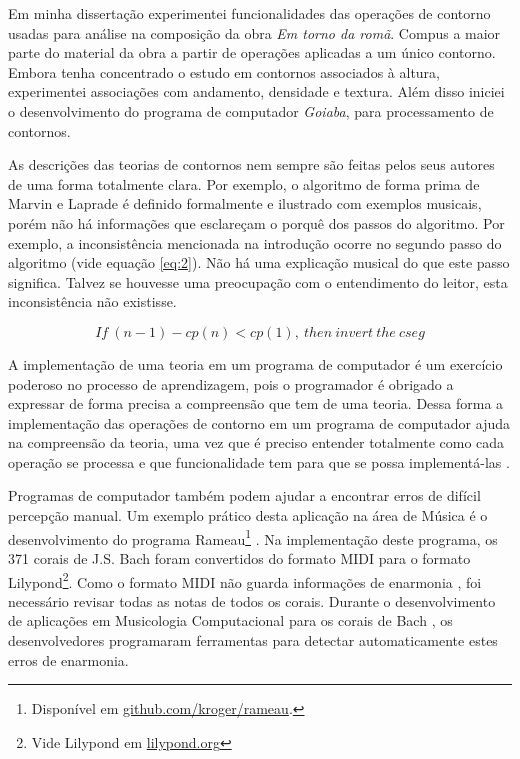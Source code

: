 \documentclass[12pt]{article}
\newcommand{\goiaba}[0]{\textit{Goiaba}}
\newcommand{\obra}[0]{\textit{Em torno da romã}}
\begin{document}

Em minha dissertação \cite{sampaio08:em} experimentei funcionalidades
das operações de contorno usadas para análise na composição da obra
\obra{}. Compus a maior parte do material da obra a partir de
operações aplicadas a um único contorno. Embora tenha concentrado o
estudo em contornos associados à altura, experimentei associações com
andamento, densidade e textura. Além disso iniciei o desenvolvimento
do programa de computador \goiaba{}, para processamento de contornos.

As descrições das teorias de contornos nem sempre são feitas pelos
seus autores de uma forma totalmente clara. Por exemplo, o algoritmo
de forma prima de Marvin e Laprade \cite{marvin.ea87:relating} é
definido formalmente e ilustrado com exemplos musicais, porém não há
informações que esclareçam o porquê dos passos do algoritmo. Por
exemplo, a inconsistência mencionada na introdução ocorre no segundo
passo do algoritmo (vide equação \ref{eq:2}). Não há uma explicação
musical do que este passo significa. Talvez se houvesse uma
preocupação com o entendimento do leitor, esta inconsistência não
existisse.

\begin{equation}
  \label{eq:2}
  If\ (n-1) - cp(n) < cp(1),\ then\ invert\ the\ cseg
\end{equation}

A implementação de uma teoria em um programa de computador é um
exercício poderoso no processo de aprendizagem, pois o programador é
obrigado a expressar de forma precisa a compreensão que tem de uma
teoria. Dessa forma a implementação das operações de contorno em um
programa de computador ajuda na compreensão da teoria, uma vez que é
preciso entender totalmente como cada operação se processa e que
funcionalidade tem para que se possa implementá-las
\cite{sampaio08:em}.

Programas de computador também podem ajudar a encontrar erros de
difícil percepção manual. Um exemplo prático desta aplicação na área
de Música é o desenvolvimento do programa Rameau\footnote{Disponível
  em \url{github.com/kroger/rameau}.}
\cite{kroger08:rameau,passos.ea09:functional}. Na implementação deste
programa, os 371 corais de J.S. Bach foram convertidos do formato MIDI
para o formato Lilypond\footnote{Vide Lilypond em
  \url{lilypond.org}}. Como o formato MIDI não guarda informações de
enarmonia \cite{selfridge-field97:beyond}, foi necessário revisar
todas as notas de todos os corais. Durante o desenvolvimento de
aplicações em Musicologia Computacional para os corais de Bach
\cite{kroger08:musicologia}, os desenvolvedores programaram
ferramentas para detectar automaticamente estes erros de enarmonia.
\end{document}
